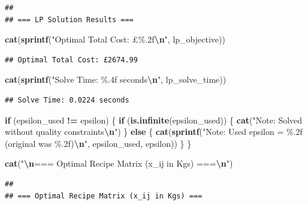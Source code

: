 \documentclass[
]{article}
\newenvironment{Shaded}{\begin{snugshade}}{\end{snugshade}}
\newcommand{\ControlFlowTok}[1]{\textcolor[rgb]{0.13,0.29,0.53}{\textbf{#1}}}
\newcommand{\FunctionTok}[1]{\textcolor[rgb]{0.13,0.29,0.53}{\textbf{#1}}}
\newcommand{\NormalTok}[1]{#1}
\newcommand{\SpecialCharTok}[1]{\textcolor[rgb]{0.81,0.36,0.00}{\textbf{#1}}}
\newcommand{\StringTok}[1]{\textcolor[rgb]{0.31,0.60,0.02}{#1}}
\begin{document}
\begin{verbatim}
## 
## === LP Solution Results ===
\end{verbatim}

\begin{Shaded}
\begin{Highlighting}[]
\FunctionTok{cat}\NormalTok{(}\FunctionTok{sprintf}\NormalTok{(}\StringTok{"Optimal Total Cost: £\%.2f}\SpecialCharTok{\textbackslash{}n}\StringTok{"}\NormalTok{, lp\_objective))}
\end{Highlighting}
\end{Shaded}

\begin{verbatim}
## Optimal Total Cost: £2674.99
\end{verbatim}

\begin{Shaded}
\begin{Highlighting}[]
\FunctionTok{cat}\NormalTok{(}\FunctionTok{sprintf}\NormalTok{(}\StringTok{"Solve Time: \%.4f seconds}\SpecialCharTok{\textbackslash{}n}\StringTok{"}\NormalTok{, lp\_solve\_time))}
\end{Highlighting}
\end{Shaded}

\begin{verbatim}
## Solve Time: 0.0224 seconds
\end{verbatim}

\begin{Shaded}
\begin{Highlighting}[]
\ControlFlowTok{if}\NormalTok{ (epsilon\_used }\SpecialCharTok{!=}\NormalTok{ epsilon) \{}
  \ControlFlowTok{if}\NormalTok{ (}\FunctionTok{is.infinite}\NormalTok{(epsilon\_used)) \{}
    \FunctionTok{cat}\NormalTok{(}\StringTok{"Note: Solved without quality constraints}\SpecialCharTok{\textbackslash{}n}\StringTok{"}\NormalTok{)}
\NormalTok{  \} }\ControlFlowTok{else}\NormalTok{ \{}
    \FunctionTok{cat}\NormalTok{(}\FunctionTok{sprintf}\NormalTok{(}\StringTok{"Note: Used epsilon = \%.2f (original was \%.2f)}\SpecialCharTok{\textbackslash{}n}\StringTok{"}\NormalTok{, epsilon\_used, epsilon))}
\NormalTok{  \}}
\NormalTok{\}}

\FunctionTok{cat}\NormalTok{(}\StringTok{"}\SpecialCharTok{\textbackslash{}n}\StringTok{=== Optimal Recipe Matrix (x\_ij in Kgs) ===}\SpecialCharTok{\textbackslash{}n}\StringTok{"}\NormalTok{)}
\end{Highlighting}
\end{Shaded}

\begin{verbatim}
## 
## === Optimal Recipe Matrix (x_ij in Kgs) ===
\end{verbatim}
\end{document}
